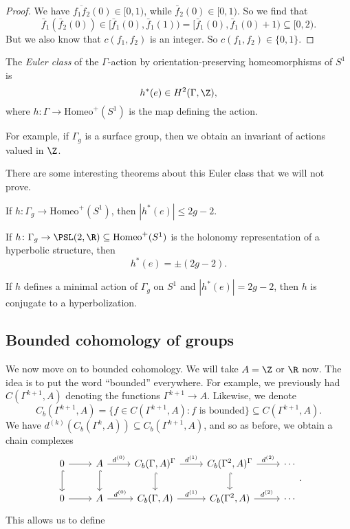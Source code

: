 \documentclass[a4paper]{article}
\newcommand\Homeo{\mathrm{Homeo}}
\begin{document}
\begin{proof}
  We have $\overline{f_1 f_2}(0) \in [0, 1)$, while $\bar{f}_2(0) \in [0, 1)$. So we find that
  \[
    \bar{f}_1(\bar{f}_2(0)) \in [\bar{f}_1(0), \bar{f}_1(1)) = [\bar{f}_1(0), \bar{f}_1(0) + 1) \subseteq [0, 2).
  \]
  But we also know that $c(f_1, f_2)$ is an integer. So $c(f_1, f_2) \in \{0, 1\}$.
\end{proof}

\begin{defi}
  The \emph{Euler class} of the $\Gamma$-action by orientation-preserving homeomorphisms of $S^1$ is
  \[
    h^*(e) \in H^2(\Gamma, \Z),
  \]
  where $h\colon \Gamma \to \Homeo^+(S^1)$ is the map defining the action.
\end{defi}

For example, if $\Gamma_g$ is a surface group, then we obtain an invariant of actions valued in $\Z$.

There are some interesting theorems about this Euler class that we will not prove.
\begin{thm}
  If $h\colon \Gamma_g \to \Homeo^+(S^1)$, then $|h^*(e)| \leq 2g - 2$.
\end{thm}

\begin{thm}
  If $h\colon \Gamma_g \to \PSL(2, \R) \subseteq \Homeo^+(S^1)$ is the holonomy representation of a hyperbolic structure, then
  \[
    h^*(e) = \pm (2g - 2).
  \]
\end{thm}

\begin{thm}[Matsumoko, 1986]
  If $h$ defines a minimal action of $\Gamma_g$ on $S^1$ and $|h^*(e)| = 2g - 2$, then $h$ is conjugate to a hyperbolization.
\end{thm}

\subsection{Bounded cohomology of groups}
We now move on to bounded cohomology. We will take $A = \Z$ or $\R$ now. The idea is to put the word ``bounded'' everywhere. For example, we previously had $C(\Gamma^{k + 1}, A)$ denoting the functions $\Gamma^{k + 1} \to A$. Likewise, we denote
\[
  C_b(\Gamma^{k + 1}, A) = \{f \in C(\Gamma^{k + 1}, A) : f\text{ is bounded}\} \subseteq C(\Gamma^{k + 1}, A).
\]
We have $d^{(k)}(C_b(\Gamma^k, A)) \subseteq C_b(\Gamma^{k + 1}, A)$, and so as before, we obtain a chain complexes
\[
  \begin{tikzcd}
    0 \ar[r] \ar[d, hook] & A \ar[r, "d^{(0)}"] \ar[d, hook] & C_b(\Gamma, A)^\Gamma \ar[r, "d^{(1)}"] \ar[d, hook] & C_b(\Gamma^2, A)^\Gamma \ar[r, "d^{(2)}"]\ar[d, hook] & \cdots\\
    0 \ar[r] & A \ar[r, "d^{(0)}"] & C_b(\Gamma, A) \ar[r, "d^{(1)}"] & C_b(\Gamma^2, A) \ar[r, "d^{(2)}"] & \cdots
  \end{tikzcd}.
\]
This allows us to define
\end{document}
